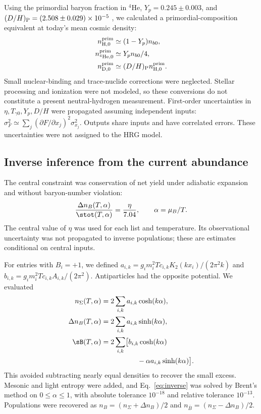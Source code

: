 Using the primordial baryon fraction in $^4$He, $Y_p=0.245\pm0.003$, and $(D/H)_{\rm P}=(2.508\pm0.029)\times10^{-5}$ \citep{Fields2025}, we calculated a primordial-composition equivalent at today's mean cosmic density:
\begin{align}
n_{{\rm H},0}^{\rm prim}&\simeq(1-Y_p)n_{b0},\\
n_{{}^4{\rm He},0}^{\rm prim}&\simeq Y_p n_{b0}/4,\\
n_{{\rm D},0}^{\rm prim}&\simeq(D/H)_{\rm P}n_{{\rm H},0}^{\rm prim}.
\label{eq:hydrogen}
\end{align}
Small nuclear-binding and trace-nuclide corrections were neglected. Stellar processing and ionization were not modeled, so these conversions do not constitute a present neutral-hydrogen measurement. First-order uncertainties in $\eta,T_{\gamma0},Y_p,D/H$ were propagated assuming independent inputs: $\sigma_F^2\simeq\sum_j(\partial F/\partial x_j)^2\sigma_{x_j}^2$. Outputs share inputs and have correlated errors. These uncertainties were not assigned to the HRG model.

\subsection{Inverse inference from the current abundance}
The central constraint was conservation of net yield under adiabatic expansion and without baryon-number violation:
\begin{equation}
\frac{\Delta n_B(T,\alpha)}{\stot(T,\alpha)}
=\frac{\eta}{7.04},\qquad \alpha=\mu_B/T.
\label{eq:inverse}
\end{equation}
The central value of $\eta$ was used for each list and temperature. Its observational uncertainty was not propagated to inverse populations; these are estimates conditional on central inputs.

For entries with $B_i=+1$, we defined $a_{i,k}=g_i m_i^2T c_{i,k}K_2(kx_i)/(2\pi^2 k)$ and $b_{i,k}=g_i m_i^2T c_{i,k}A_{i,k}/(2\pi^2)$. Antiparticles had the opposite potential. We evaluated
\begin{align}
n_\Sigma(T,\alpha)&=2\sum_{i,k}a_{i,k}\cosh(k\alpha),\\
\Delta n_B(T,\alpha)&=2\sum_{i,k}a_{i,k}\sinh(k\alpha),\\
\sB(T,\alpha)&=2\sum_{i,k}\bigl[b_{i,k}\cosh(k\alpha)\nonumber\\
&\hspace{18mm}-\alpha a_{i,k}\sinh(k\alpha)\bigr].
\label{eq:inversekernels}
\end{align}
This avoided subtracting nearly equal densities to recover the small excess. Mesonic and light entropy were added, and Eq.~\eqref{eq:inverse} was solved by Brent's method on $0\leq\alpha\leq1$, with absolute tolerance $10^{-18}$ and relative tolerance $10^{-13}$. Populations were recovered as $n_B=(n_\Sigma+\Delta n_B)/2$ and $n_{\bar B}=(n_\Sigma-\Delta n_B)/2$.


